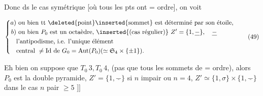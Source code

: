 Donc ds le cas symétrique [où tous les pts ont = ordre], on voit

\[
\left\{\begin{aligned}
a)&\ \text{ou bien tt \deleted{point}\inserted{sommet} est déterminé par son étoile,}\\
b)&\ \text{ou bien }P_0\text{ est un octaèdre, }\inserted{\text{(cas régulier)}}\
 Z'=\{1,\underline-\},\quad\underline-\\
 &\text{l'antipodisme, i.e. l'unique élément}\\
 &\text{central }\ne\mathrm{Id}\text{ de }G_0=\operatorname{Aut}(P_0)
 (\simeq\mathfrak S_4\times\{\pm1\}).
\end{aligned}\right.
\tag*{$(49)$}
\]

Eh bien on suppose  que $T_0\,3,T_0\,4$, (pas que tous les sommets de = ordre), alors $P_0$ est la double pyramide, $Z'=\{1,\underline-\}$ si $n$ impair ou $n=4$, $Z'\simeq\{1,\sigma\}\times\{1,\underline-\}$ dans le cas $n$ pair $\geqslant5$ $]\!]$
